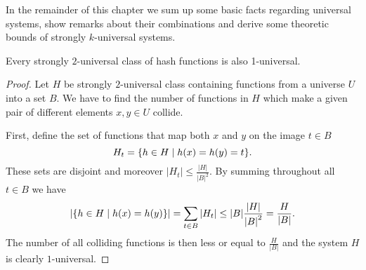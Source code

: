 In the remainder of this chapter we sum up some basic facts regarding universal systems, show remarks about their combinations and derive some theoretic bounds of strongly $k$-universal systems.
\begin{remark}
Every strongly $2$-universal class of hash functions is also 1-universal.
\end{remark}
\begin{proof}
Let $H$ be strongly $2$-universal class containing functions from a universe $U$ into a set $B$. We have to find the number of functions in $H$ which make a given pair of different elements $x, y \in U$ collide. 

First, define the set of functions that map both $x$ and $y$ on the image $t \in B$ \[ H_t = \lbrace h \in H \mid h(x) = h(y) = t \rbrace \text{.} \] These sets are disjoint and moreover $|H_t| \leq \frac{|H|}{{|B|}^{2}}$. By summing throughout all $t \in B$ we have
\begin{displaymath}
|\lbrace h \in H \mid h(x) = h(y) \rbrace | = \displaystyle \sum_{t \in B} |H_t| \leq |B| \frac{|H|}{{|B|}^{2}} = \frac{H}{|B|}\text{.}
\end{displaymath}
The number of all colliding functions is then less or equal to $\frac{H}{|B|}$ and the system $H$ is clearly $1$-universal.
\end{proof}

